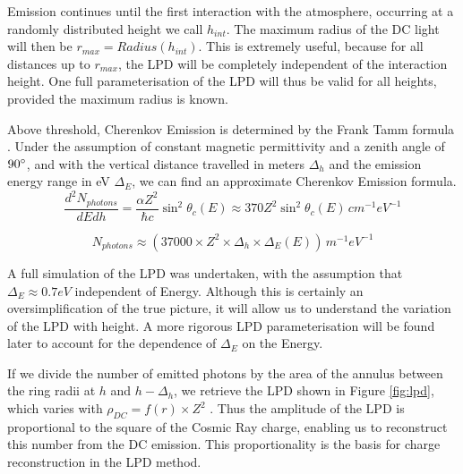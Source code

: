 \documentclass[11pt]{article}
\begin{document}
Emission continues until the first interaction with the atmosphere, occurring at a randomly distributed height we call $h_{int}$. The maximum radius of the DC light will then be $r_{max} = Radius(h_{int})$. This is extremely useful, because for all distances up to $r_{max}$, the LPD will be completely independent of the interaction height. One full parameterisation of the LPD will thus be valid for all heights, provided the maximum radius is known.

Above threshold, Cherenkov Emission is determined by the Frank Tamm formula \cite{ppreview}.  Under the assumption of constant magnetic permittivity and a zenith angle of $90\degree$, and with  the vertical distance travelled in meters $\Delta_{h}$ and the emission energy range in eV $\Delta_{E}$, we can find an approximate Cherenkov Emission formula.
\[ \frac{d^{2}N_{photons}}{dEdh} = \frac{\alpha Z^{2}}{\hbar c} \sin^{2} \theta_{c}(E) \approx 370 Z^{2} \sin^{2} \theta_{c}(E)\, cm^{-1}eV^{-1} \]

\[ N_{photons} \approx (37000 \times Z^{2} \times \Delta_{h} \times \Delta_{E}(E))\, m^{-1}eV^{-1}\]
 
A full simulation of the LPD was undertaken, with the assumption that $\Delta_{E} \approx 0.7 eV$ independent of Energy. Although this is certainly an oversimplification of the true picture, it will allow us to understand the variation of the LPD with height. A more rigorous LPD parameterisation will be found later to account for the dependence of $\Delta_{E}$ on the Energy. 

If we divide the number of emitted photons by the area of the annulus between the ring radii at $h$ and $h - \Delta_{h}$, we retrieve the LPD shown in Figure \ref{fig:lpd}, which varies with $ \rho_{DC}  = f(r) \times Z^{2}$ . Thus the amplitude of the LPD is proportional to the square of the Cosmic Ray charge, enabling us to reconstruct this number from the DC emission. This proportionality is the basis for charge reconstruction in the LPD method.
\end{document}
